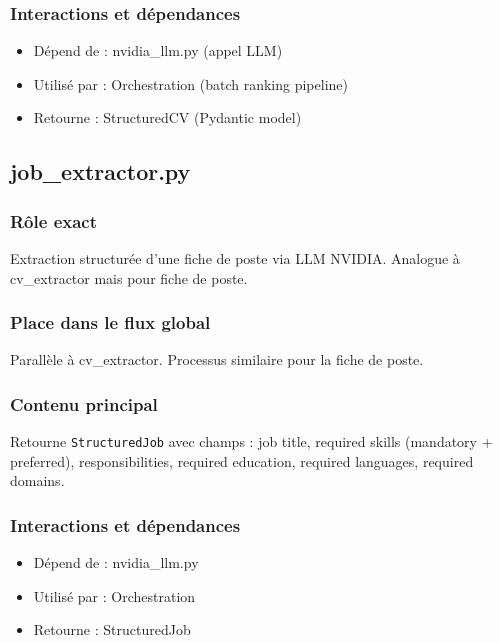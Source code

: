 \documentclass[12pt,a4paper,oneside]{book}
\begin{document}
\subsubsection{Interactions et dépendances}

\begin{itemize}
    \item Dépend de : nvidia\_llm.py (appel LLM)
    \item Utilisé par : Orchestration (batch ranking pipeline)
    \item Retourne : StructuredCV (Pydantic model)
\end{itemize}

\subsection{job\_extractor.py}

\subsubsection{Rôle exact}

Extraction structurée d'une fiche de poste via LLM NVIDIA. Analogue à cv\_extractor mais pour fiche de poste.

\subsubsection{Place dans le flux global}

Parallèle à cv\_extractor. Processus similaire pour la fiche de poste.

\subsubsection{Contenu principal}

Retourne \texttt{StructuredJob} avec champs : job title, required skills (mandatory + preferred), responsibilities, required education, required languages, required domains.

\subsubsection{Interactions et dépendances}

\begin{itemize}
    \item Dépend de : nvidia\_llm.py
    \item Utilisé par : Orchestration
    \item Retourne : StructuredJob
\end{itemize}
\end{document}
